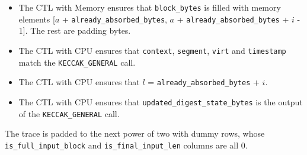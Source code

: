 \begin{itemize}
    \begin{itemize}
        \item The CTL with Memory ensures that \texttt{block\_bytes} is filled with memory elements [$a$ + \texttt{already\_absorbed\_bytes}, $a$ + \texttt{already\_absorbed\_bytes} + $i$ - 1]. The rest are padding bytes.
        \item The CTL with CPU ensures that \texttt{context}, \texttt{segment}, \texttt{virt} and \texttt{timestamp} match the \texttt{KECCAK\_GENERAL} call.
        \item The CTL with CPU ensures that $l$ = \texttt{already\_absorbed\_bytes} + $i$.
        \item The CTL with CPU ensures that \texttt{updated\_digest\_state\_bytes} is the output of the \texttt{KECCAK\_GENERAL} call.
    \end{itemize}
\end{itemize}

The trace is padded to the next power of two with dummy rows, whose \texttt{is\_full\_input\_block} and \texttt{is\_final\_input\_len} columns are all 0.
